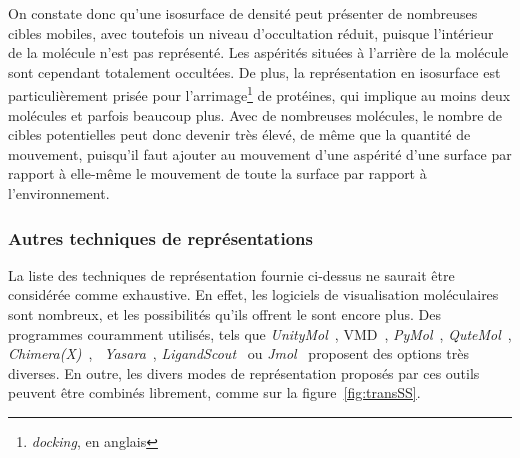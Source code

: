 	On constate donc qu'une isosurface de densité peut présenter de nombreuses cibles mobiles, avec toutefois un niveau d'occultation réduit, puisque l'intérieur de la molécule n'est pas représenté. Les aspérités situées à \og l'arrière \fg{} de la molécule sont cependant totalement occultées. De plus, la représentation en isosurface est particulièrement prisée pour l'arrimage\footnote{\emph{docking}, en anglais} de protéines, qui implique au moins deux molécules et parfois beaucoup plus. Avec de nombreuses molécules, le nombre de cibles potentielles peut donc devenir très élevé, de même que la quantité de mouvement, puisqu'il faut ajouter au mouvement d'une aspérité d'une surface par rapport à elle-même le mouvement de toute la surface par rapport à l'environnement.
	
	\subsubsection{Autres techniques de représentations}
	La liste des techniques de représentation fournie ci-dessus ne saurait être considérée comme exhaustive. En effet, les logiciels de visualisation moléculaires sont nombreux, et les possibilités qu'ils offrent le sont encore plus. Des programmes couramment utilisés, tels que \emph{UnityMol}~\cite{doutreligne2014unitymol}, VMD~\cite{humphrey1996vmd}, \emph{PyMol}~\cite{delano2002pymol}, \emph{QuteMol}~\cite{tarini2006ambient, tarini2006qutemol}, \emph{Chimera(X)}~\cite{pettersen2004ucsf, goddard2017ucsf}, ~\emph{Yasara}~\cite{krieger2014yasara}, \emph{LigandScout}~\cite{wolber2005ligandscout} ou \emph{Jmol}~\cite{herraez2006biomolecules} proposent des options très diverses. En outre, les divers modes de représentation proposés par ces outils peuvent être combinés librement, comme sur la figure~\ref{fig:transSS}.
	
